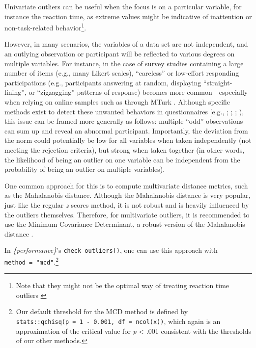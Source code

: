 \documentclass[sn-basic, lineno,pdflatex]{sn-jnl}
\begin{document}
Univariate outliers can be useful when the focus is on a particular
variable, for instance the reaction time, as extreme values might be
indicative of inattention or non-task-related behavior\footnote{ Note
  that they might not be the optimal way of treating reaction time
  outliers \citep{ratcliff1993methods, van1995statistical}}.

However, in many scenarios, the variables of a data set are not
independent, and an outlying observation or participant will be
reflected to various degrees on multiple variables. For instance, in the
case of survey studies containing a large number of items (e.g., many
Likert scales), ``careless'' or low-effort responding participations
(e.g., participants answering at random, displaying ``straight-lining'',
or ``zigzagging'' patterns of response) becomes more common---especially
when relying on online samples such as through MTurk
\citep{aruguete2019serious, goldammer2020careless, ward2023dealing}.
Although specific methods exist to detect these unwanted behaviors in
questionnaires {[}e.g., \citet{cao2018z}; \citet{curran2016methods};
\citet{carelesspackage}; \citet{zijlstra2011outliers}), this issue can
be framed more generally as follows: multiple ``odd'' observations can
sum up and reveal an abnormal participant. Importantly, the deviation
from the norm could potentially be low for all variables when taken
independently (not meeting the rejection criteria), but strong when
taken together (in other words, the likelihood of being an outlier on
one variable can be independent from the probability of being an outlier
on multiple variables).

One common approach for this is to compute multivariate distance
metrics, such as the Mahalanobis distance. Although the Mahalanobis
distance is very popular, just like the regular \emph{z} scores method,
it is not robust and is heavily influenced by the outliers themselves.
Therefore, for multivariate outliers, it is recommended to use the
Minimum Covariance Determinant, a robust version of the Mahalanobis
distance \citep[MCD,][]{leys2018outliers, leys2019outliers}.

In \emph{\{performance\}}'s \texttt{check\_outliers()}, one can use this
approach with \texttt{method\ =\ "mcd"}.\footnote{Our default threshold
  for the MCD method is defined by
  \texttt{stats::qchisq(p\ =\ 1\ -\ 0.001,\ df\ =\ ncol(x))}, which
  again is an approximation of the critical value for \emph{p}
  \textless{} .001 consistent with the thresholds of our other methods.}
\end{document}
